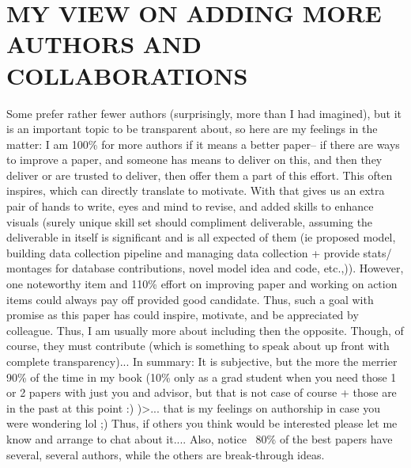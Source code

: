 \section*{MY VIEW ON ADDING MORE AUTHORS AND COLLABORATIONS}
Some prefer rather fewer authors (surprisingly, more than I had imagined), but it is an important topic to be transparent about, so here are my feelings in the matter: I am 100\% for more authors if it means a better paper-- if there are ways to improve a paper, and someone has means to deliver on this, and then they deliver or are trusted to deliver, then offer them a part of this effort. This often inspires, which can directly translate to motivate. With that gives us an extra pair of hands to write, eyes and mind to revise, and added skills to enhance visuals (surely unique skill set should compliment deliverable, assuming the deliverable in itself is significant and is all expected of them (ie proposed model, building data collection pipeline and managing data collection + provide stats/ montages for database contributions, novel model idea and code, etc.,)). However, one noteworthy item and 110\% effort on improving paper and working on action items could always pay off provided good candidate. Thus, such a goal with promise as this paper has could inspire, motivate, and be appreciated by colleague. Thus, I am usually more about including then the opposite. Though, of course, they must contribute (which is something to speak about up front with complete transparency)... In summary: It is subjective, but the more the merrier 90\% of the time in my book (10\% only as a grad student when you need those 1 or 2 papers with just you and advisor, but that is not case of course + those are in the past at this point :) )>... that is my feelings on authorship in case you were wondering lol ;) Thus, if others you think would be interested please let me know and arrange to chat about it.... Also, notice ~80\% of the best papers have several, several authors, while the others are break-through ideas.

\endgroup
